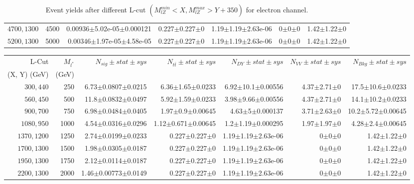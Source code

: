 \documentclass[]{article}
\begin{document}
\begin{table}
\begin{center}
{\begin{tabular}{ |r|r|r|r|r|r|r|}
$4700,1300$ & 4500 & 0.00936$\pm$5.02e-05$\pm$0.000121 & 0.227$\pm$0.227$\pm$0 & 1.19$\pm$1.19$\pm$2.63e-06 & 0$\pm$0$\pm$0 & 1.42$\pm$1.22$\pm$0 \\
$5200,1300$ & 5000 & 0.00346$\pm$1.97e-05$\pm$4.58e-05 & 0.227$\pm$0.227$\pm$0 & 1.19$\pm$1.19$\pm$2.63e-06 & 0$\pm$0$\pm$0 & 1.42$\pm$1.22$\pm$0 \\
\hline 
\end{tabular}
}
\end{center}
\caption{Event yields after different L-cut $(M_{lZ}^{min} < X, M_{lZ}^{max} > Y + 350)$ for electron channel.}
\end{table}
\begin{table}
\begin{center}
\scriptsize{
\begin{tabular}{ |r|r|r|r|r|r|r|}
\hline 
L-Cut & $M_{l^*}$ & $N_{sig}\pm stat \pm sys $ &$N_{t\bar{t}}\pm stat \pm sys $ & $N_{DY}\pm stat \pm sys $ & $N_{VV}\pm stat \pm sys $ &$N_{Bkg}\pm stat \pm sys$\\
 (X, Y) (GeV) & (GeV) & && &&\\
\hline 
$300, 440$ & 250 & 6.73$\pm$0.0807$\pm$0.0215 & 6.36$\pm$1.65$\pm$0.0233 & 6.92$\pm$10.1$\pm$0.00556 & 4.37$\pm$2.71$\pm$0 & 17.5$\pm$10.6$\pm$0.0233 \\
$560, 450$ & 500 & 11.8$\pm$0.0832$\pm$0.0497 & 5.92$\pm$1.59$\pm$0.0233 & 3.98$\pm$9.66$\pm$0.00556 & 4.37$\pm$2.71$\pm$0 & 14.1$\pm$10.2$\pm$0.0233 \\
$900, 700$ & 750 & 6.98$\pm$0.0484$\pm$0.0405 & 1.97$\pm$0.9$\pm$0.00645 & 4.63$\pm$5$\pm$0.000137 & 3.71$\pm$2.63$\pm$0 & 10.2$\pm$5.72$\pm$0.00645 \\
$1080,950$ & 1000 & 4.54$\pm$0.0316$\pm$0.0296 & 1.12$\pm$0.671$\pm$0.00645 & 1.2$\pm$1.19$\pm$0.000295 & 1.97$\pm$1.97$\pm$0 & 4.28$\pm$2.4$\pm$0.00645 \\
$1370,1200$ & 1250 & 2.74$\pm$0.0199$\pm$0.0233 & 0.227$\pm$0.227$\pm$0 & 1.19$\pm$1.19$\pm$2.63e-06 & 0$\pm$0$\pm$0 & 1.42$\pm$1.22$\pm$0 \\
$1700,1300$ & 1500 & 1.98$\pm$0.0305$\pm$0.0187 & 0.227$\pm$0.227$\pm$0 & 1.19$\pm$1.19$\pm$2.63e-06 & 0$\pm$0$\pm$0 & 1.42$\pm$1.22$\pm$0 \\
$1950,1300$ & 1750 & 2.12$\pm$0.0114$\pm$0.0187 & 0.227$\pm$0.227$\pm$0 & 1.19$\pm$1.19$\pm$2.63e-06 & 0$\pm$0$\pm$0 & 1.42$\pm$1.22$\pm$0 \\
$2200,1300$ & 2000 & 1.46$\pm$0.00773$\pm$0.0149 & 0.227$\pm$0.227$\pm$0 & 1.19$\pm$1.19$\pm$2.63e-06 & 0$\pm$0$\pm$0 & 1.42$\pm$1.22$\pm$0 \\

\end{tabular}}
\end{center}
\end{table}
\end{document}
